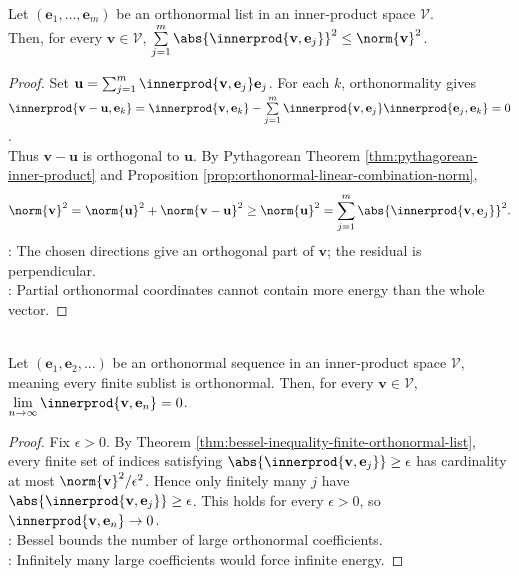 \begin{theorem} \label{thm:bessel-inequality-finite-orthonormal-list} \\
Let $(\mathbf{e}_1,\ldots,\mathbf{e}_m)$ be an orthonormal list in an inner-product space $\mathcal{V}$.\\
Then, for every $\mathbf{v}\in\mathcal{V}$, $\sum\limits_{j=1}^{m}\abs{\innerprod{\mathbf{v},\mathbf{e}_j}}^2\leq\norm{\mathbf{v}}^2$.
\begin{proof}
Set $\mathbf{u}=\sum_{j=1}^{m}\innerprod{\mathbf{v},\mathbf{e}_j}\mathbf{e}_j$. For each $k$, orthonormality gives $\innerprod{\mathbf{v}-\mathbf{u},\mathbf{e}_k} =\innerprod{\mathbf{v},\mathbf{e}_k} -\sum\limits_{j=1}^{m}\innerprod{\mathbf{v},\mathbf{e}_j}\innerprod{\mathbf{e}_j,\mathbf{e}_k}=0$.\\
Thus $\mathbf{v}-\mathbf{u}$ is orthogonal to $\mathbf{u}$. By Pythagorean Theorem \ref{thm:pythagorean-inner-product} and Proposition \ref{prop:orthonormal-linear-combination-norm},
\begin{align}
\norm{\mathbf{v}}^2=\norm{\mathbf{u}}^2+\norm{\mathbf{v}-\mathbf{u}}^2
\geq \norm{\mathbf{u}}^2
=\sum_{j=1}^{m}\abs{\innerprod{\mathbf{v},\mathbf{e}_j}}^2.
\nonumber
\end{align}
: The chosen directions give an orthogonal part of $\mathbf{v}$; the residual is perpendicular.\\
: Partial orthonormal coordinates cannot contain more energy than the whole vector.
\end{proof}
\end{theorem}

\begin{corollary} \label{cor:orthonormal-sequence-coefficients-vanish} \\
Let $(\mathbf{e}_1,\mathbf{e}_2,\ldots)$ be an orthonormal sequence in an inner-product space $\mathcal{V}$, meaning every finite sublist is orthonormal. Then, for every $\mathbf{v}\in\mathcal{V}$, $\lim\limits_{n\to\infty}\innerprod{\mathbf{v},\mathbf{e}_n}=0$.
\begin{proof}
Fix $\epsilon>0$. By Theorem \ref{thm:bessel-inequality-finite-orthonormal-list}, every finite set of indices satisfying $\abs{\innerprod{\mathbf{v},\mathbf{e}_j}}\geq\epsilon$ has cardinality at most $\norm{\mathbf{v}}^2/\epsilon^2$. Hence only finitely many $j$ have $\abs{\innerprod{\mathbf{v},\mathbf{e}_j}}\geq\epsilon$. This holds for every $\epsilon>0$, so $\innerprod{\mathbf{v},\mathbf{e}_n}\to0$.\\
: Bessel bounds the number of large orthonormal coefficients.\\
: Infinitely many large coefficients would force infinite energy.
\end{proof}
\end{corollary}

